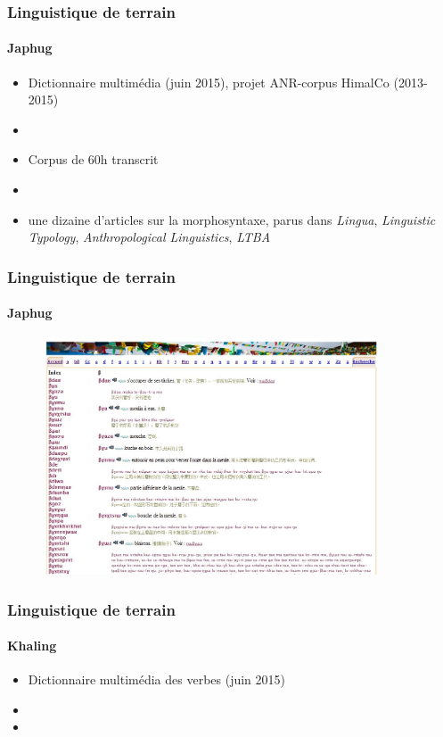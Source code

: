 \documentclass[xcolor=table]{beamer}
\begin{document}
      \begin{frame} 
 \frametitle{Linguistique de terrain} 
  \framesubtitle{Japhug} 
 \begin{itemize}%
\item Dictionnaire multimédia (juin 2015), projet ANR-corpus HimalCo (2013-2015)
\item {}
\item Corpus de 60h transcrit
\item {}  
\item une dizaine d'articles sur la morphosyntaxe, parus dans \textit{Lingua}, \textit{Linguistic Typology}, \textit{Anthropological Linguistics}, \textit{LTBA}
\end{itemize}
    \end{frame} 
    
          \begin{frame} 
 \frametitle{Linguistique de terrain} 
  \framesubtitle{Japhug} 
        \begin{figure}[H]
\centering
\includegraphics[height=70mm]{example-dict.jpg}
\end{figure}   
        \end{frame} 
      \begin{frame} 
 \frametitle{Linguistique de terrain} 
  \framesubtitle{Khaling} 
  \begin{itemize}%
\item Dictionnaire multimédia des verbes (juin 2015)
\item {}  
\item {}
\end{itemize}
    \end{frame} 
    
\end{document}
